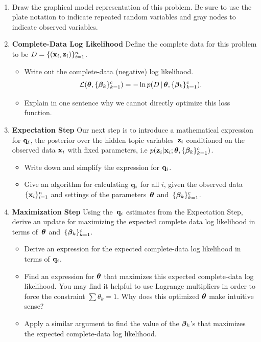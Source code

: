 \documentclass[submit]{harvardml}
\begin{document}
	
	\begin{problem}
		~
		
		\begin{enumerate}
			\item Draw the graphical model representation of this 
			problem. Be sure to use the plate notation to 
			indicate repeated random variables and gray nodes 
			to indicate observed variables.
			
			\item \textbf{Complete-Data Log Likelihood} Define the complete data for this problem to be $D = \{(\mathbf{x}_i, \mathbf{z}_i)\}_{i=1}^n$. 
			\begin{itemize}
				\item Write out the complete-data (negative) log likelihood. \[\mathcal{L}(\boldsymbol{\theta}, \{\boldsymbol{\beta}_k\}^c_{k=1}) =  -\ln p(D \,|\,\boldsymbol{\theta}, \{\boldsymbol{\beta}_k\}^c_{k=1}).\] 
				\item Explain in one sentence why we cannot directly optimize this loss function.
			\end{itemize}
			
			
			
			\item \textbf{Expectation Step}
			Our next step is to introduce a mathematical expression for $\mathbf{q}_i$, the posterior over the hidden topic variables~$\mathbf{z}_i$ conditioned on the observed data $\mathbf{x}_i$ with fixed parameters, i.e $p(\mathbf{z}_i | \mathbf{x}_i; \boldsymbol{\theta}, \{\boldsymbol{\beta}_k\}^c_{k=1})$.
			
			\begin{itemize}
				\item  Write down and simplify the expression for $\mathbf{q}_i$. 
				\item  Give an algorithm for calculating $\mathbf{q}_i$ for all $i$, given the observed data~$\{\mathbf{x}_i\}^n_{i=1}$ and settings of the parameters~$\boldsymbol{\theta}$ and~$\{\boldsymbol{\beta}_k\}^c_{k=1}$.
				
			\end{itemize}
			
			\item \textbf{Maximization Step}
			Using the~$\mathbf{q}_i$ estimates from the Expectation Step, derive an update for maximizing the expected complete data log likelihood in terms of~$\boldsymbol{\theta}$ and~$\{\boldsymbol{\beta}_k\}^c_{k=1}$.
			
			\begin{itemize}
				\item Derive an expression for the expected complete-data log likelihood in terms of $\mathbf{q}_i$.
				\item Find an expression for $\boldsymbol{\theta}$ that maximizes this expected complete-data log likelihood. You may find it helpful to use Lagrange multipliers in order to force the constraint $\sum \theta_k = 1$. Why does this optimized $\boldsymbol{\theta}$ make intuitive sense?
				\item Apply a similar argument to find the value of the $\boldsymbol{\beta}_{k}$'s that maximizes the expected complete-data log likelihood. 
			\end{itemize}
		\end{enumerate}
		
	\end{problem}
	
\end{document}
